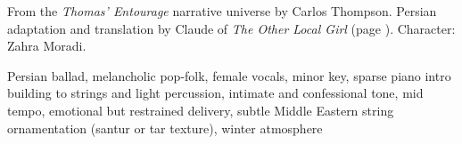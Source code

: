 
\begin{notes}
From the \emph{Thomas’ Entourage} narrative universe by Carlos Thompson. Persian adaptation and translation by Claude of \emph{The Other Local Girl} (page \pageref{sec:the-other-local-girl}). Character: Zahra Moradi.
\end{notes}
\begin{style}
Persian ballad, melancholic pop-folk, female vocals, minor key, sparse piano intro building to strings and light percussion, intimate and confessional tone, mid tempo, emotional but restrained delivery, subtle Middle Eastern string ornamentation (santur or tar texture), winter atmosphere
\end{style}
